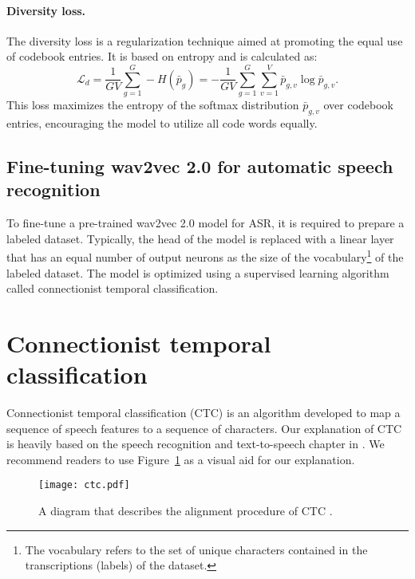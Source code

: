 \paragraph*{Diversity loss.}
The diversity loss is a regularization technique aimed at promoting the equal use of codebook entries. 
It is based on entropy and is calculated as:
\begin{equation}
    \mathcal{L}_d = \dfrac{1}{GV}\sum_{g=1}^{G} -H(\bar{p}_{g}) = -\dfrac{1}{GV}\sum_{g=1}^{G} \sum_{v=1}^{V} \bar{p}_{g,v} \log \bar{p}_{g,v}.
\end{equation}
This loss maximizes the entropy of the softmax distribution $\bar{p}_{g,v}$ over codebook entries, encouraging the model to utilize all code words equally.

\subsection{Fine-tuning wav2vec 2.0 for automatic speech recognition}\label{subsec:finetune}
To fine-tune a pre-trained wav2vec 2.0 model for ASR, it is required to prepare a labeled dataset.
Typically, the head of the model is replaced with a linear layer that has an equal number of output neurons as the size of the vocabulary\footnote{The vocabulary refers to the set of unique characters contained in the transcriptions (labels) of the dataset.} of the labeled dataset.
The model is optimized using a supervised learning algorithm called connectionist temporal classification.

\section{Connectionist temporal classification}\label{sec:ctc}
Connectionist temporal classification (CTC) \cite{graves2006connectionist} is an algorithm 
developed to map a sequence of speech features to a sequence of characters.
Our explanation of CTC is heavily based on the speech recognition and text-to-speech chapter in \cite{jurafskyspeech}.
We recommend readers to use Figure~\ref{ctc} as a visual aid for our explanation.

\begin{figure}[!ht]
    \centering
    
    \texttt{[image: ctc.pdf]}
    \caption{A diagram that describes the alignment procedure of CTC \cite{jurafskyspeech}.}
    \label{ctc}
\end{figure}

